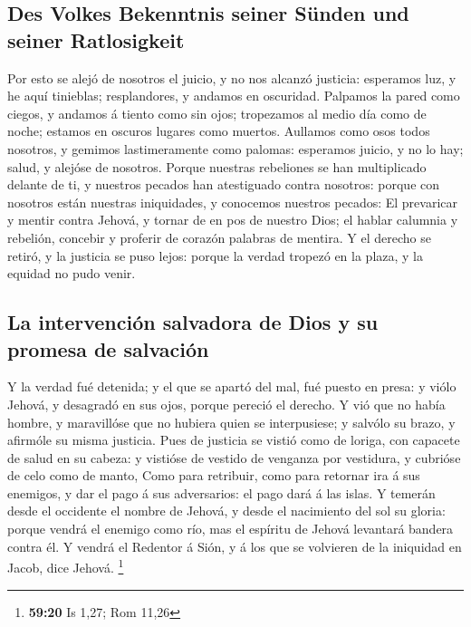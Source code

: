 \hypertarget{des-volkes-bekenntnis-seiner-suxfcnden-und-seiner-ratlosigkeit}{%
\subsection{Des Volkes Bekenntnis seiner Sünden und seiner
Ratlosigkeit}\label{des-volkes-bekenntnis-seiner-suxfcnden-und-seiner-ratlosigkeit}}

 Por esto se alejó de nosotros el juicio, y no nos alcanzó
justicia: esperamos luz, y he aquí tinieblas; resplandores, y andamos en
oscuridad.  Palpamos la pared como ciegos, y andamos á
tiento como sin ojos; tropezamos al medio día como de noche; estamos en
oscuros lugares como muertos.  Aullamos como osos todos
nosotros, y gemimos lastimeramente como palomas: esperamos juicio, y no
lo hay; salud, y alejóse de nosotros.  Porque nuestras
rebeliones se han multiplicado delante de ti, y nuestros pecados han
atestiguado contra nosotros: porque con nosotros están nuestras
iniquidades, y conocemos nuestros pecados:  El prevaricar
y mentir contra Jehová, y tornar de en pos de nuestro Dios; el hablar
calumnia y rebelión, concebir y proferir de corazón palabras de mentira.
 Y el derecho se retiró, y la justicia se puso lejos:
porque la verdad tropezó en la plaza, y la equidad no pudo venir.

\hypertarget{la-intervenciuxf3n-salvadora-de-dios-y-su-promesa-de-salvaciuxf3n}{%
\subsection{La intervención salvadora de Dios y su promesa de
salvación}\label{la-intervenciuxf3n-salvadora-de-dios-y-su-promesa-de-salvaciuxf3n}}

 Y la verdad fué detenida; y el que se apartó del mal,
fué puesto en presa: y viólo Jehová, y desagradó en sus ojos, porque
pereció el derecho.  Y vió que no había hombre, y
maravillóse que no hubiera quien se interpusiese; y salvólo su brazo, y
afirmóle su misma justicia.  Pues de justicia se vistió
como de loriga, con capacete de salud en su cabeza: y vistióse de
vestido de venganza por vestidura, y cubrióse de celo como de manto,
 Como para retribuir, como para retornar ira á sus
enemigos, y dar el pago á sus adversarios: el pago dará á las islas.
 Y temerán desde el occidente el nombre de Jehová, y
desde el nacimiento del sol su gloria: porque vendrá el enemigo como
río, mas el espíritu de Jehová levantará bandera contra él.
 Y vendrá el Redentor á Sión, y á los que se volvieren de
la iniquidad en Jacob, dice Jehová. \footnote{\textbf{59:20} Is 1,27;
  Rom 11,26}


